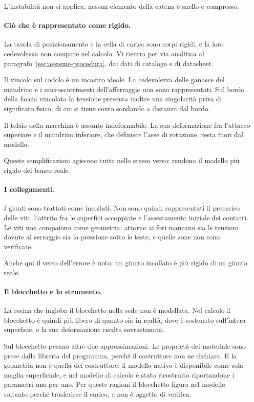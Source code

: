 L'instabilità non si applica: nessun elemento della catena è snello e compresso.

\paragraph{Ciò che è rappresentato come rigido.}
La tavola di posizionamento e la cella di carico sono corpi rigidi, e la loro
cedevolezza non compare nel calcolo. Vi rientra per via analitica al
paragrafo~\ref{sec:assieme-procedura}, dai dati di catalogo e di datasheet.

Il vincolo sul codolo è un incastro ideale. La cedevolezza delle ganasce del
mandrino e i microscorrimenti dell'afferraggio non sono rappresentati. Sul bordo
della faccia vincolata la tensione presenta inoltre una singolarità priva di
significato fisico, di cui si tiene conto sondando a distanza dal bordo.

Il telaio della macchina è assunto indeformabile. La sua deformazione fra
l'attacco superiore e il mandrino inferiore, che definisce l'asse di rotazione,
resta fuori dal modello.

Queste semplificazioni agiscono tutte nello stesso verso: rendono il modello più
rigido del banco reale.

\paragraph{I collegamenti.}
I giunti sono trattati come incollati. Non sono quindi rappresentati il
precarico delle viti, l'attrito fra le superfici accoppiate e l'assestamento
iniziale dei contatti. Le viti non compaiono come geometria: attorno ai fori
mancano sia le tensioni dovute al serraggio sia la pressione sotto le teste, e
quelle zone non sono verificate.

Anche qui il verso dell'errore è noto: un giunto incollato è più rigido di un
giunto reale.

\paragraph{Il blocchetto e lo strumento.}
La resina che ingloba il blocchetto nella sede non è modellata. Nel calcolo il
blocchetto è quindi più libero di quanto sia in realtà, dove è sostenuto
sull'intera superficie, e la sua deformazione risulta sovrastimata.

Sul blocchetto pesano altre due approssimazioni. Le proprietà del materiale sono
prese dalla libreria del programma, perché il costruttore non ne dichiara. E la
geometria non è quella del costruttore: il modello nativo è disponibile come
sola maglia superficiale, e nel modello di calcolo è stato ricostruito
riportandone i parametri uno per uno. Per queste ragioni il blocchetto figura
nel modello soltanto perché trasferisce il carico, e non è oggetto di verifica.

